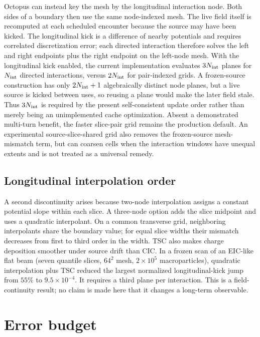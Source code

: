 \documentclass[a4paper,fleqn]{cas-sc}
\begin{document}
Octopus can instead key the mesh by the longitudinal interaction node.
Both sides of a boundary then use the same node-indexed mesh.  The live
field itself is recomputed at each scheduled encounter because the source
may have been kicked.  The longitudinal kick is a difference of nearby
potentials and requires correlated discretization error; each directed
interaction therefore solves the left and right endpoints plus the right
endpoint on the left-node mesh.  With the longitudinal kick enabled, the
current implementation evaluates $3N_{\rm int}$
planes for $N_{\rm int}$ directed interactions, versus $2N_{\rm int}$ for
pair-indexed grids.  A
frozen-source construction has only $2N_{\rm int}+1$ algebraically distinct
node planes,
but a live source is kicked between uses, so reusing a plane would make the
later field stale.  Thus $3N_{\rm int}$ is required by the present
self-consistent update
order rather than merely being an unimplemented cache optimization.  Absent a
demonstrated multi-turn benefit, the faster slice-pair grid remains the
production default.  An
experimental source-slice-shared grid also removes the frozen-source
mesh-mismatch term, but can coarsen cells when the interaction windows have
unequal extents and is not treated as a universal remedy.

\subsection{Longitudinal interpolation order}
\label{sec:zinterp}

A second discontinuity arises because two-node interpolation assigns a
constant potential slope within each slice.  A three-node option adds the
slice midpoint and uses a quadratic interpolant.  On a common transverse
grid, neighboring interpolants share the boundary value; for equal slice
widths their mismatch decreases from first to third order in the width.
TSC also makes charge deposition smoother under source drift than CIC.
In a frozen scan of an EIC-like flat beam (seven quantile slices, $64^2$
mesh, $2\times10^5$ macroparticles), quadratic interpolation plus TSC
reduced the largest normalized longitudinal-kick jump from $55\%$ to
$9.5\times10^{-4}$.  It requires a third plane per interaction.  This is a
field-continuity result; no claim is made here that it changes a long-term
observable.
\FloatBarrier
\section{Error budget}
\label{sec:error}
\end{document}
